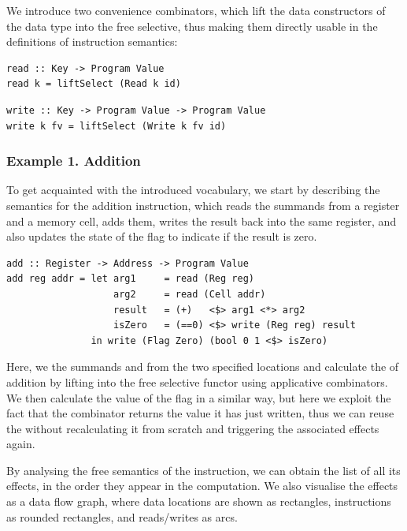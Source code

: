We introduce two convenience combinators, which lift the data constructors of
the  data type into the free selective, thus making them directly usable
in the definitions of instruction semantics:

\vspace{0.5mm}
\begin{verbatim}
read :: Key -> Program Value
read k = liftSelect (Read k id)
\end{verbatim}
\vspace{1mm}
\begin{verbatim}
write :: Key -> Program Value -> Program Value
write k fv = liftSelect (Write k fv id)
\end{verbatim}

\subsubsection{Example 1. Addition}

To get acquainted with the introduced vocabulary, we start by describing the
semantics for the addition instruction, which reads the summands from a
register and a memory cell, adds them, writes the result back into the same
register, and also updates the state of the  flag to indicate if the
result is zero.

\begin{verbatim}
add :: Register -> Address -> Program Value
add reg addr = let arg1     = read (Reg reg)
                   arg2     = read (Cell addr)
                   result   = (+)   <$> arg1 <*> arg2
                   isZero   = (==0) <$> write (Reg reg) result
               in write (Flag Zero) (bool 0 1 <$> isZero)
\end{verbatim}
\vspace{1mm}

\noindent
Here, we  the summands  and  from the two specified
locations and calculate the  of addition by lifting \hs{(+)} into the
free selective functor using applicative combinators. We then calculate the
value of the  flag in a similar way, but here we exploit the fact that
the  combinator returns the value it has just written, thus we can
reuse the  without recalculating it from scratch and triggering the
associated effects again.

By analysing the free semantics of the  instruction, we can obtain the
list of all its effects, in the order they appear in the computation. We also
visualise the effects as a data flow graph, where data locations are shown as
rectangles, instructions as rounded rectangles, and reads/writes as arcs.

